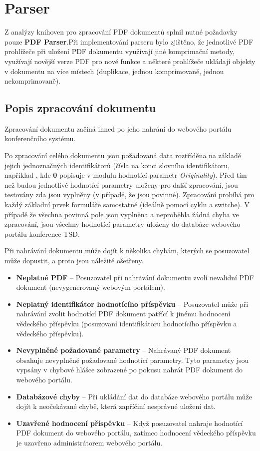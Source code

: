 \section{Parser}
Z analýzy knihoven pro zpracování PDF dokumentů splnil nutné požadavky pouze \textbf{PDF Parser}.Při implementování parseru bylo zjištěno, že jednotlivé PDF prohlížeče při uložení PDF dokumentu využívají jiné komprimační metody, využívají novější verze PDF pro nové funkce a některé prohlížeče ukládají objekty v dokumentu na více místech (duplikace, jednou komprimovaně, jednou nekomprimovaně).

\subsection{Popis zpracování dokumentu}
Zpracování dokumentu začíná ihned po jeho nahrání do webového portálu konferenčního systému. %
\par
Po zpracování celého dokumentu jsou požadovaná data roztříděna na základě jejich jednoznačných identifikátorů (čísla na konci slovního identifikátoru, například , kde \textbf{0} popisuje v modulu hodnotící parametr \textit{Originality}). Před tím než budou jednotlivé hodnotící parametry uloženy pro další zpracování, jsou testovány zda jsou vyplněny (v případě, že jsou povinné). Zpracování probíhá pro každý základní prvek formuláře samostatně (ideálně pomocí cyklu a switche). V případě že všechna povinná pole jsou vyplněna a neproběhla žádná chyba ve zpracování, jsou všechny hodnotící parametry uloženy do databáze webového portálu konference TSD.
\par
Při nahrávání dokumentu může dojít k několika chybám, kterých se posuzovatel může dopustit, a proto jsou náležitě ošetřeny.
\begin{itemize}
	\item \textbf{Neplatné PDF} -- Posuzovatel při nahrávání dokumentu zvolí nevalidní PDF dokument (nevygenerovaný webovým portálem).
	\item \textbf{Neplatný identifikátor hodnotícího příspěvku} -- Posuzovatel může při nahrávání zvolit hodnotící PDF dokument patřící k jinému hodnocení vědeckého příspěvku (posuzovaní identifikátoru hodnotícího příspěvku a vědeckého příspěvku).
	\item \textbf{Nevyplněné požadované parametry} -- Nahrávaný PDF dokument obsahuje nevyplněné požadované hodnotící parametry. Tyto parametry jsou vypsány v chybové hlášce zobrazené po pokusu nahrát PDF dokument do webového portálu.
	\item \textbf{Databázové chyby} -- Při ukládání dat do databáze webového portálu může dojít k neočekávané chybě, která zapříčiní nesprávné uložení dat. 
	\item \textbf{Uzavřené hodnocení příspěvku} -- Když posuzovatel nahraje hodnotící PDF dokument do webového portálu, zatímco hodnocení vědeckého příspěvku je uzavřeno administrátorem webového portálu.
\end{itemize}

